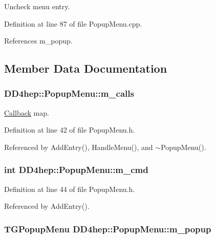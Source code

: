 Uncheck menu entry. 

Definition at line 87 of file PopupMenu.cpp.

References m\_\-popup.

\subsection{Member Data Documentation}
\hypertarget{class_d_d4hep_1_1_popup_menu_a19b33a5d34c5fca703a9e5f6946f5e10}{
\subsubsection[{m\_\-calls}]{ {\bf DD4hep::PopupMenu::m\_\-calls}}}
\label{class_d_d4hep_1_1_popup_menu_a19b33a5d34c5fca703a9e5f6946f5e10}


\hyperlink{class_d_d4hep_1_1_callback}{Callback} map. 

Definition at line 42 of file PopupMenu.h.

Referenced by AddEntry(), HandleMenu(), and $\sim$PopupMenu().\hypertarget{class_d_d4hep_1_1_popup_menu_ad631ad62359a2754913630d248967f71}{
\subsubsection[{m\_\-cmd}]{\setlength{\rightskip}{0pt plus 5cm}int {\bf DD4hep::PopupMenu::m\_\-cmd}}}
\label{class_d_d4hep_1_1_popup_menu_ad631ad62359a2754913630d248967f71}


Definition at line 44 of file PopupMenu.h.

Referenced by AddEntry().\hypertarget{class_d_d4hep_1_1_popup_menu_a97937d940ef3c3d519f0ed1a5b8638ee}{
\subsubsection[{m\_\-popup}]{\setlength{\rightskip}{0pt plus 5cm}TGPopupMenu {\bf DD4hep::PopupMenu::m\_\-popup}}}
\label{class_d_d4hep_1_1_popup_menu_a97937d940ef3c3d519f0ed1a5b8638ee}


